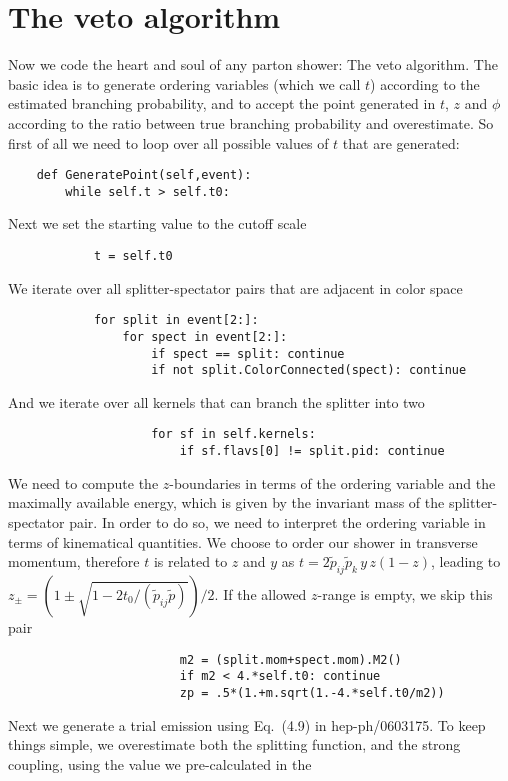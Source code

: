 \documentclass[10pt,fleqn]{scrartcl}
\begin{document}
\section{The veto algorithm}
Now we code the heart and soul of any parton shower: The veto algorithm.
The basic idea is to generate ordering variables (which we call $t$)
according to the estimated branching probability, and to accept the point
generated in $t$, $z$ and $\phi$ according to the ratio between true 
branching probability and overestimate. So first of all we need to loop 
over all possible values of $t$ that are generated:
\begin{verbatim}
    def GeneratePoint(self,event):
        while self.t > self.t0:
\end{verbatim}
Next we set the starting value to the cutoff scale
\begin{verbatim}
            t = self.t0
\end{verbatim}
We iterate over all splitter-spectator pairs that are adjacent
in color space
\begin{verbatim}
            for split in event[2:]:
                for spect in event[2:]:
                    if spect == split: continue
                    if not split.ColorConnected(spect): continue
\end{verbatim}
And we iterate over all kernels that can branch the splitter
into two
\begin{verbatim}
                    for sf in self.kernels:
                        if sf.flavs[0] != split.pid: continue
\end{verbatim}
We need to compute the $z$-boundaries in terms of the ordering variable
and the maximally available energy, which is given by the invariant mass
of the splitter-spectator pair. In order to do so, we need to interpret 
the ordering variable in terms of kinematical quantities. We choose to 
order our shower in transverse momentum, therefore $t$ is related to $z$ 
and $y$ as $t=2\tilde{p}_{ij}\tilde{p}_k\,y\,z(1-z)$, leading to 
$z_\pm=(1\pm\sqrt{1-2t_0/(\tilde{p}_{ij}\tilde{p})})/2$. If the allowed 
$z$-range is empty, we skip this pair
\begin{verbatim}
                        m2 = (split.mom+spect.mom).M2()
                        if m2 < 4.*self.t0: continue
                        zp = .5*(1.+m.sqrt(1.-4.*self.t0/m2))
\end{verbatim}
Next we generate a trial emission using Eq.~(4.9) in hep-ph/0603175. 
To keep things simple, we overestimate both the splitting function,
and the strong coupling, using the value we pre-calculated in the 
\end{document}
